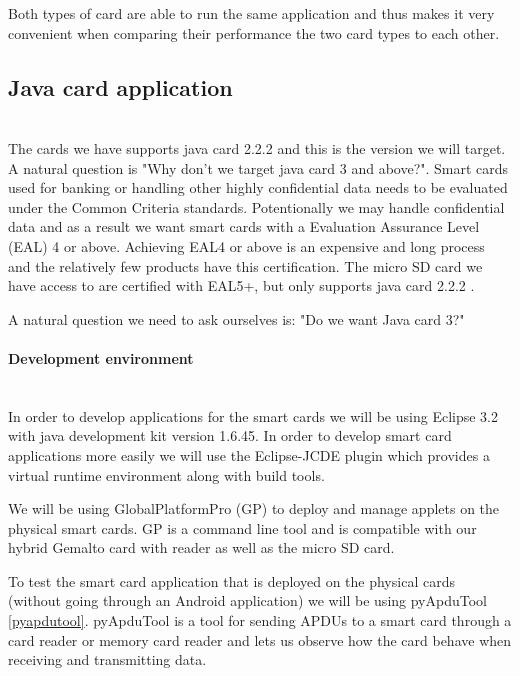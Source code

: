 Both types of card are able to run the same application and thus makes it very convenient when comparing their performance the two card types to each other.

\iffalse %

\subsection{Java card application}\mbox{}\\
The cards we have supports java card 2.2.2 and this is the version we will target. A natural question is "Why don't we target java card 3 and above?". Smart cards used for banking or handling other highly confidential data needs to be evaluated under the Common Criteria \cite{commoncriteria} standards. Potentionally we may handle confidential data and as a result we want smart cards with a Evaluation Assurance Level (EAL) 4 or above. Achieving EAL4 or above is an expensive and long process and the relatively few products have this certification. The micro SD card we have access to are certified with EAL5+, but only supports java card 2.2.2 \cite{gemaltoidgo8030}.


A natural question we need to ask ourselves is: "Do we want Java card 3?"



\paragraph{Development environment}\mbox{}\\
In order to develop applications for the smart cards we will be using Eclipse 3.2 with java development kit version 1.6.45. In order to develop smart card applications more easily we will use the Eclipse-JCDE plugin \cite{eclipseJCDE} which provides a virtual runtime environment along with build tools.

We will be using GlobalPlatformPro (GP) \cite{globalplatform} to deploy and manage applets on the physical smart cards. GP is a command line tool and is compatible with our hybrid Gemalto card with reader as well as the micro SD card.

To test the smart card application that is deployed on the physical cards (without going through an Android application) we will be using pyApduTool \ref{pyapdutool}. pyApduTool is a tool for sending APDUs to a smart card through a card reader or memory card reader and lets us observe how the card behave when receiving and transmitting data.

